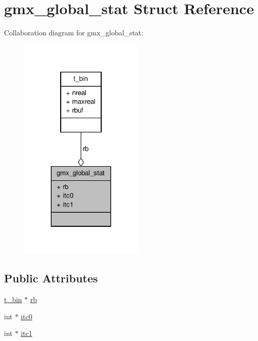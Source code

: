 \hypertarget{structgmx__global__stat}{\section{gmx\-\_\-global\-\_\-stat \-Struct \-Reference}
\label{structgmx__global__stat}
}


\-Collaboration diagram for gmx\-\_\-global\-\_\-stat\-:
\nopagebreak
\begin{figure}[H]
\begin{center}
\leavevmode
\includegraphics[width=168pt]{structgmx__global__stat__coll__graph}
\end{center}
\end{figure}
\subsection*{\-Public \-Attributes}
\begin{DoxyCompactItemize}
\item 
\hyperlink{structt__bin}{t\-\_\-bin} $\ast$ \hyperlink{structgmx__global__stat_a25195b3ee6f215973db11c6eeee7d171}{rb}
\item 
int $\ast$ \hyperlink{structgmx__global__stat_af8451acf59c6c85e84ae637675f2d993}{itc0}
\item 
int $\ast$ \hyperlink{structgmx__global__stat_a8daa312fcc0b6c1382a97f934d11e368}{itc1}
\end{DoxyCompactItemize}


